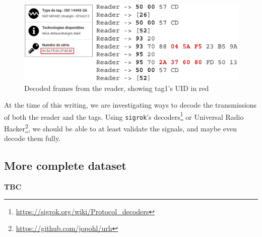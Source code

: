 \begin{figure}[htp!]
  \centering
  \includegraphics[scale=0.35]{figures/data_decoded-frames_app.png}
  \caption{Decoded frames from the reader, showing tag1's UID in red}
  \label{fig:decoded}
\end{figure}

At the time of this writing, we are investigating ways to decode the transmissions of both the reader and the tags. Using \texttt{sigrok}'s decoders\footnote{\url{https://sigrok.org/wiki/Protocol_decoders}} or Universal Radio Hacker\footnote{\url{https://github.com/jopohl/urh}}, we should be able to at least validate the signals, and maybe even decode them fully.

\subsection{More complete dataset}

\textbf{TBC}
